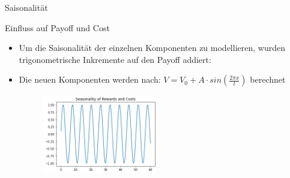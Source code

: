 \documentclass{beamer}
\begin{document}
\begin{frame}{Saisonalität}
    \begin{block}{Einfluss auf Payoff und Cost}
    \begin{itemize}
        \item Um die Saisonalität der einzelnen Komponenten zu modellieren, wurden trigonometrische Inkremente auf den Payoff addiert:   
        \item Die neuen Komponenten werden nach: \(V = V_0 + A\cdot sin(\frac{2\pi x}{t})\) berechnet \pause
        \begin{figure}[htp]
            \centering
            \includegraphics[width=5cm]{Figs/Seasonality.png}
            \label{fig:seasonality}
        \end{figure}
    \end{itemize}
    \end{block} 
    
\end{frame}

\end{document}
